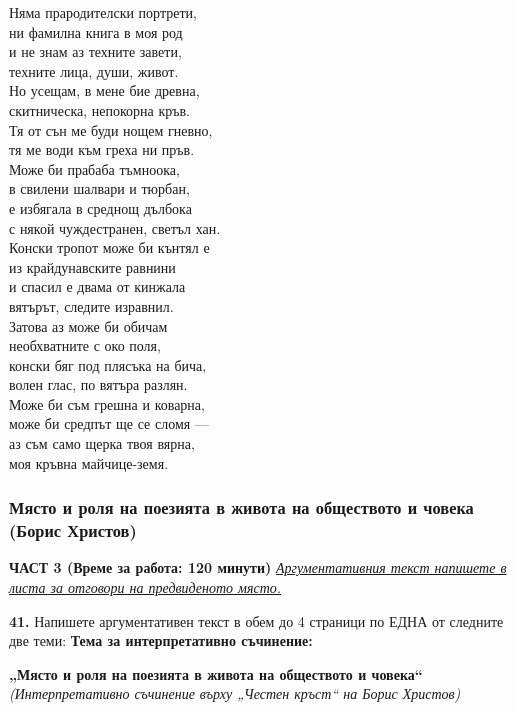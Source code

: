 \documentclass[12pt,a4paper]{article}
\begin{document}
\begin{flushleft}
Няма прародителски портрети,
\\
ни фамилна книга в моя род
\\
и не знам аз техните завети,
\\
техните лица, души, живот.
\vspace{0.5cm}
\\
Но усещам, в мене бие древна,
\\
скитническа, непокорна кръв.
\\
Тя от сън ме буди нощем гневно,
\\
тя ме води към греха ни пръв.
\vspace{0.5cm}
\\
Може би прабаба тъмноока,
\\
в свилени шалвари и тюрбан,
\\
е избягала в среднощ дълбока
\\
с някой чуждестранен, светъл хан.
\vspace{0.5cm}
\\
Конски тропот може би кънтял е
\\
из крайдунавските равнини
\\
и спасил е двама от кинжала
\\
вятърът, следите изравнил.
\vspace{0.5cm}
\\
Затова аз може би обичам
\\
необхватните с око поля,
\\
конски бяг под плясъка на бича,
\\
волен глас, по вятъра разлян.
\vspace{0.5cm}
\\
Може би съм грешна и коварна,
\\
може би средпът ще се сломя —
\\
аз съм само щерка твоя вярна,
\\
моя кръвна майчице-земя.
\end{flushleft}

\subsubsection{Място и роля на поезията в живота на обществото и човека (Борис Христов)}
\vspace{0.5cm}
\begin{center}
\textbf{ЧАСТ 3 (Време за работа: 120 минути)}
\vspace{0.2cm}
{\textit{\underline{Аргументативния текст напишете в листа за отговори на предвиденото място.}}}
\vspace{0.1cm}
\end{center}
\textbf{41.} Напишете аргументативен текст в обем до 4 страници по ЕДНА от следните две теми:
\vspace{0.2cm}
\textbf{Тема за интерпретативно съчинение:}
\vspace{0.1cm}
\begin{center}
\textbf{„Място и роля на поезията в живота на обществото и човека“}
\\
\textit{(Интерпретативно съчинение върху „Честен кръст“ на Борис Христов)}
\end{center}
\end{document}
